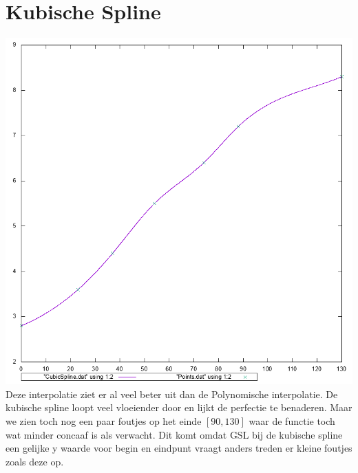 \documentclass[10pt,a4paper]{article}
\begin{document}
\section{Kubische Spline}
\includegraphics[scale=0.7]{CubicSpline}
Deze interpolatie ziet er al veel beter uit dan de Polynomische interpolatie. De kubische spline loopt veel vloeiender door en lijkt de perfectie te benaderen. Maar we zien toch nog een paar foutjes op het einde $\left [ 90, 130 \right ]$ waar de functie toch wat minder concaaf is als verwacht. Dit komt omdat GSL bij de kubische spline een gelijke y waarde voor begin en eindpunt vraagt anders treden er kleine foutjes zoals deze op.
\end{document}
